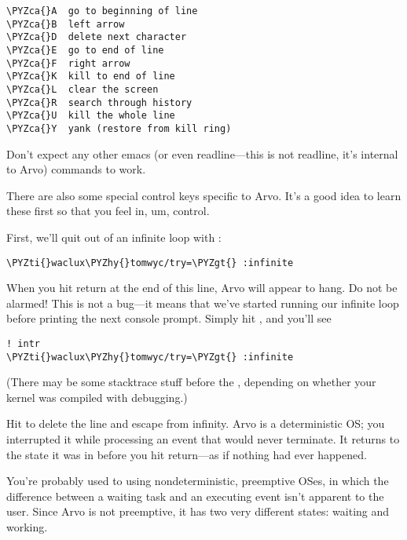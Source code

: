 \begin{framed_shaded}
\begin{Verbatim}[fontsize=\relsize{-2.5},fontseries=b,commandchars=\\\{\}]
\PYZca{}A  go to beginning of line
\PYZca{}B  left arrow
\PYZca{}D  delete next character
\PYZca{}E  go to end of line
\PYZca{}F  right arrow
\PYZca{}K  kill to end of line
\PYZca{}L  clear the screen
\PYZca{}R  search through history
\PYZca{}U  kill the whole line
\PYZca{}Y  yank (restore from kill ring)
\end{Verbatim}
\end{framed_shaded}
Don't expect any other emacs (or even readline---this is not readline, it's
internal to Arvo) commands to work.

There are also some special control keys specific to Arvo.  It's
a good idea to learn these first so that you feel in, um,
control.

First, we'll quit out of an infinite loop with :

\begin{framed_shaded}
\begin{Verbatim}[fontsize=\relsize{-2.5},fontseries=b,commandchars=\\\{\}]
\PYZti{}waclux\PYZhy{}tomwyc/try=\PYZgt{} :infinite
\end{Verbatim}
\end{framed_shaded}
When you hit return at the end of this line, Arvo will appear to
hang.  Do not be alarmed!  This is not a bug---it means that
we've started running our infinite loop before printing the next
console prompt.  Simply hit , and you'll see

\begin{framed_shaded}
\begin{Verbatim}[fontsize=\relsize{-2.5},fontseries=b,commandchars=\\\{\}]
! intr
\PYZti{}waclux\PYZhy{}tomwyc/try=\PYZgt{} :infinite
\end{Verbatim}
\end{framed_shaded}
(There may be some stacktrace stuff before the , depending
on whether your kernel was compiled with debugging.)

Hit  to delete the line and escape from infinity.  Arvo is a
deterministic OS; you interrupted it while processing an event
that would never terminate.  It returns to the state it was in
before you hit return---as if nothing had ever happened.

You're probably used to using nondeterministic, preemptive OSes,
in which the difference between a waiting task and an
executing event isn't apparent to the user.  Since Arvo is not
preemptive, it has two very different states: waiting and
working.

